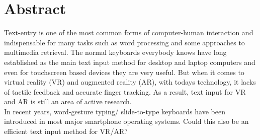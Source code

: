 \chapter{Abstract}
Text-entry is one of the most common forms of computer-human interaction and indispensable for many tasks such as word processing and some approaches to multimedia retrieval. The normal keyboards everybody knows have long established as the main text input method for desktop and laptop computers and even for touchscreen based devices they are very useful. But when it comes to virtual reality (VR) and augmented reality (AR), with todays technology, it lacks of tactile feedback and accurate finger tracking. As a result, text input for VR and AR is still an area of active research.\\
In recent years, word-gesture typing/ slide-to-type keyboards have been introduced in most major smartphone operating systems. Could this also be an efficient text input method for VR/AR?